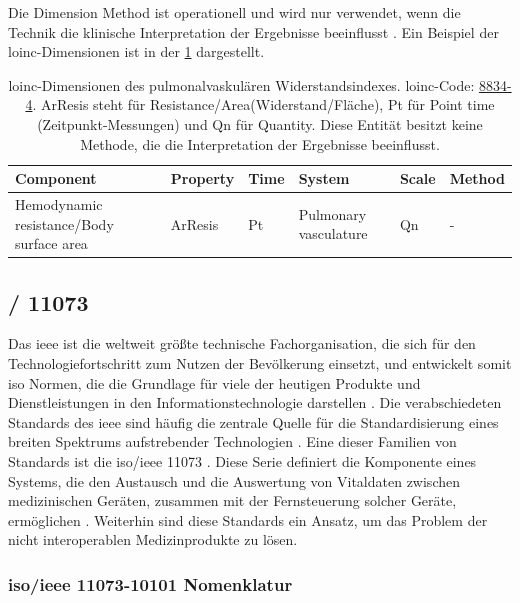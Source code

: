 Die Dimension \glqq Method\grqq{} ist operationell und wird nur verwendet, wenn die Technik die klinische Interpretation der Ergebnisse beeinflusst \cite{interop}. Ein Beispiel der \ac{loinc}-Dimensionen ist in der \ref{tab:loincdimensions} dargestellt.

\begin{table}[ht]
	\centering 
	\small 
	\caption[\acs{loinc}-Dimensionen]{\ac{loinc}-Dimensionen des pulmonalvaskulären Widerstandsindexes. \ac{loinc}-Code: \href{https://loinc.org/8834-4/}{8834-4}. ArResis steht für  Resistance/Area\grqq (Widerstand/Fläche), Pt für Point time (Zeitpunkt-Messungen) und Qn für Quantity. Diese Entität besitzt keine Methode, die die Interpretation der Ergebnisse beeinflusst.}
	\label{tab:loincdimensions}
	\begin{tabular}{|p{3cm}|l|l|p{2cm}|l|l|}
		\hline
		\bfseries Component & \bfseries Property & \bfseries Time & \bfseries System & \bfseries Scale & \bfseries Method \\ \hline
		Hemodynamic resistance/Body surface area & ArResis & Pt & Pulmonary vasculature & Qn & - \\ \hline	
	\end{tabular}
\end{table}

\subsection{/ 11073\texttrademark{}} \label{subsec:ieee}

Das \acf{ieee} ist die weltweit größte technische Fachorganisation, die sich für den Technologiefortschritt zum Nutzen der Bevölkerung einsetzt, und entwickelt somit \ac{iso} Normen, die die Grundlage für viele der heutigen Produkte und Dienstleistungen in den Informationstechnologie darstellen \cite{ieeeiso}. Die verabschiedeten Standards des \ac{ieee} sind häufig die zentrale Quelle für die Standardisierung eines breiten Spektrums aufstrebender Technologien \cite{ieeeglance}. Eine dieser Familien von Standards ist die \acs{iso}/\ac{ieee} 11073\texttrademark{} \cite{ieeeglance, ieeearch}. Diese Serie definiert die Komponente eines Systems, die den Austausch und die Auswertung von Vitaldaten zwischen medizinischen Geräten, zusammen mit der Fernsteuerung solcher Geräte, ermöglichen \cite{ieeearch}. Weiterhin sind diese Standards ein Ansatz, um das Problem der nicht interoperablen Medizinprodukte zu lösen. 

\subsubsection{\acs{iso}/\acs{ieee} 11073-10101\texttrademark{} Nomenklatur} \label{subsub:ieee1107310101}

